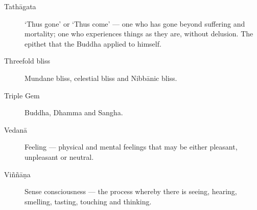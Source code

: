\begin{description}
\item[Tathāgata] ‘Thus gone’ or ‘Thus come’ --- one who has gone beyond
  suffering and mortality; one who experiences things as they are,
  without delusion. The epithet that the Buddha applied to himself.

\item[Threefold bliss] Mundane bliss, celestial bliss and Nibbānic
  bliss.

\item[Triple Gem] Buddha, Dhamma and Sangha.

\item[Vedanā] Feeling --- physical and mental feelings that may be either
  pleasant, unpleasant or neutral.

\item[Viññāṇa] Sense consciousness --- the process whereby there is
  seeing, hearing, smelling, tasting, touching and thinking.

\end{description}

